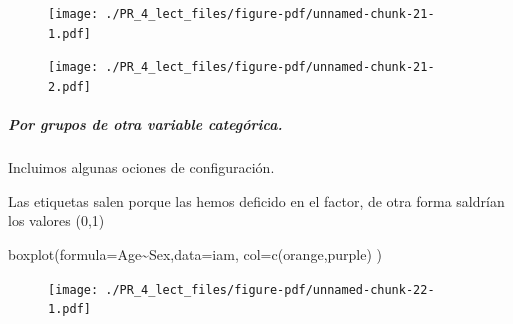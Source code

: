 \documentclass[
  letterpaper,
  DIV=11,
  numbers=noendperiod]{scrreprt}
\let\oldsubparagraph\subparagraph
\renewcommand{\subparagraph}[1]{\oldsubparagraph{#1}\mbox{}}
\newenvironment{Shaded}{\begin{snugshade}}{\end{snugshade}}
\newcommand{\AttributeTok}[1]{\textcolor[rgb]{0.40,0.45,0.13}{#1}}
\newcommand{\CommentTok}[1]{\textcolor[rgb]{0.37,0.37,0.37}{#1}}
\newcommand{\DecValTok}[1]{\textcolor[rgb]{0.68,0.00,0.00}{#1}}
\newcommand{\FloatTok}[1]{\textcolor[rgb]{0.68,0.00,0.00}{#1}}
\newcommand{\FunctionTok}[1]{\textcolor[rgb]{0.28,0.35,0.67}{#1}}
\newcommand{\NormalTok}[1]{\textcolor[rgb]{0.00,0.23,0.31}{#1}}
\newcommand{\SpecialCharTok}[1]{\textcolor[rgb]{0.37,0.37,0.37}{#1}}
\newcommand{\StringTok}[1]{\textcolor[rgb]{0.13,0.47,0.30}{#1}}
\begin{document}
\begin{figure}[H]

{\centering \texttt{[image: ./PR\_4\_lect\_files/figure-pdf/unnamed-chunk-21-1.pdf]}

}

\end{figure}

\begin{Shaded}
\end{Shaded}

\begin{figure}[H]

{\centering \texttt{[image: ./PR\_4\_lect\_files/figure-pdf/unnamed-chunk-21-2.pdf]}

}

\end{figure}

\hypertarget{por-grupos-de-otra-variable-categuxf3rica.}{%
\subparagraph{Por grupos de otra variable
categórica.}\label{por-grupos-de-otra-variable-categuxf3rica.}}

Incluimos algunas ociones de configuración.

Las etiquetas salen porque las hemos deficido en el factor, de otra
forma saldrían los valores (0,1)

\begin{Shaded}
\begin{Highlighting}[]
\FunctionTok{boxplot}\NormalTok{(}\AttributeTok{formula=}\NormalTok{Age}\SpecialCharTok{\textasciitilde{}}\NormalTok{Sex,}\AttributeTok{data=}\NormalTok{iam,}
        \AttributeTok{col=}\FunctionTok{c}\NormalTok{(}\StringTok{\textquotesingle{}orange\textquotesingle{}}\NormalTok{,}\StringTok{\textquotesingle{}purple\textquotesingle{}}\NormalTok{)}
\NormalTok{        )}
\end{Highlighting}
\end{Shaded}

\begin{figure}[H]

{\centering \texttt{[image: ./PR\_4\_lect\_files/figure-pdf/unnamed-chunk-22-1.pdf]}

}

\end{figure}
\end{document}
